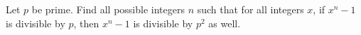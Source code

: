 Let $p$ be prime. Find all possible integers $n$ such that for all integers $x$, if $x^n-1$ is divisible by $p$, then $x^n-1$ is divisible by $p^2$ as well.